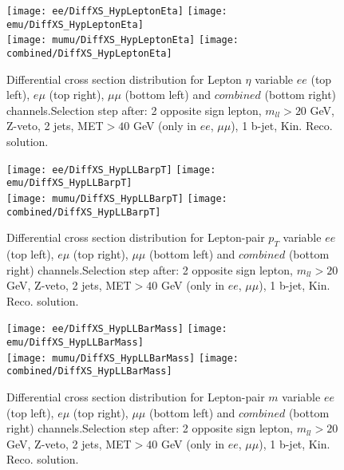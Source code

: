 \documentclass[12pt, a4paper, titlepage]{article}
\begin{document}
\clearpage
\newpage


\begin{figure}
  \texttt{[image: ee/DiffXS\_HypLeptonEta]}
  \texttt{[image: emu/DiffXS\_HypLeptonEta]}\\
  \texttt{[image: mumu/DiffXS\_HypLeptonEta]}
  \texttt{[image: combined/DiffXS\_HypLeptonEta]}
\caption{Differential cross section distribution for  Lepton $\eta$ variable  $ee$ (top left), $e\mu$ (top right), $\mu\mu$ (bottom left) and $combined$ (bottom right) channels.\newline Selection step after: 2 opposite sign lepton, $m_{ll}>20$ GeV, Z-veto, 2 jets, MET$>40$ GeV (only in $ee$, $\mu\mu$), 1 b-jet, Kin. Reco. solution.}
\end{figure}

\clearpage
\newpage


\begin{figure}
  \texttt{[image: ee/DiffXS\_HypLLBarpT]}
  \texttt{[image: emu/DiffXS\_HypLLBarpT]}\\
  \texttt{[image: mumu/DiffXS\_HypLLBarpT]}
  \texttt{[image: combined/DiffXS\_HypLLBarpT]}
\caption{Differential cross section distribution for  Lepton-pair $p_T$ variable  $ee$ (top left), $e\mu$ (top right), $\mu\mu$ (bottom left) and $combined$ (bottom right) channels.\newline Selection step after: 2 opposite sign lepton, $m_{ll}>20$ GeV, Z-veto, 2 jets, MET$>40$ GeV (only in $ee$, $\mu\mu$), 1 b-jet, Kin. Reco. solution.}
\end{figure}

\clearpage
\newpage


\begin{figure}
  \texttt{[image: ee/DiffXS\_HypLLBarMass]}
  \texttt{[image: emu/DiffXS\_HypLLBarMass]}\\
  \texttt{[image: mumu/DiffXS\_HypLLBarMass]}
  \texttt{[image: combined/DiffXS\_HypLLBarMass]}
\caption{Differential cross section distribution for  Lepton-pair $m$ variable  $ee$ (top left), $e\mu$ (top right), $\mu\mu$ (bottom left) and $combined$ (bottom right) channels.\newline Selection step after: 2 opposite sign lepton, $m_{ll}>20$ GeV, Z-veto, 2 jets, MET$>40$ GeV (only in $ee$, $\mu\mu$), 1 b-jet, Kin. Reco. solution.}
\end{figure}
\end{document}
